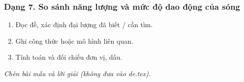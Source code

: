 \subsubsection{Dạng 7. So sánh năng lượng và mức độ dao động của sóng}
\begin{phuongphap}
\begin{enumerate}
\item Đọc đề, xác định đại lượng đã biết / cần tìm.
\item Ghi công thức hoặc mô hình liên quan.
\item Tính toán và đối chiếu đơn vị, dấu.
\end{enumerate}
\end{phuongphap}
\begin{vidumau}
\textit{Chèn bài mẫu và lời giải (không đưa vào de.tex).}
\end{vidumau}


